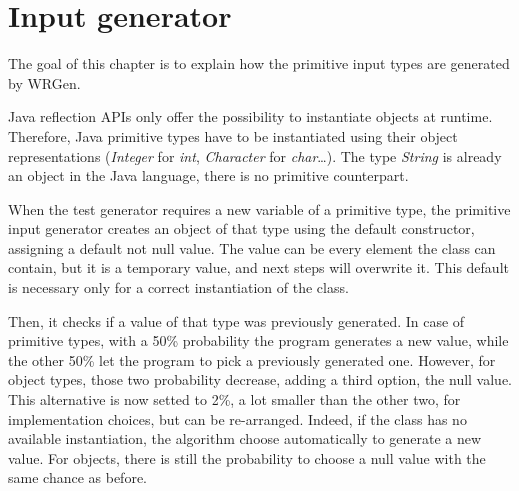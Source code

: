 \section{Input generator}\label{sec:pig}
The goal of this chapter is to explain how the primitive input types are generated by WRGen.

Java reflection APIs only offer the possibility to instantiate objects at runtime. Therefore, Java primitive types have to be instantiated using their object representations (\emph{Integer} for \emph{int}, \emph{Character} for \emph{char}\dots). The type \emph{String} is already an object in the Java language, there is no primitive counterpart.

When the test generator requires a new variable of a primitive type, the primitive input generator creates an object of that type using the default constructor, assigning a default not null value. The value can be every element the class can contain, but it is a temporary value, and next steps will overwrite it. 
This default is necessary only for a correct instantiation of the class.

Then, it checks if a value of that type was previously generated. In case of primitive types, with a 50\% probability the program generates a new value, while the other 50\% let the program to pick a previously generated one.
However, for object types, those two probability decrease, adding a third option, the null value. This alternative is now setted to 2\%, a lot smaller than the other two, for implementation choices, but can be re-arranged.
Indeed, if the class has no available instantiation, the algorithm choose automatically to generate a new value.
For objects, there is still the probability to choose a null value with the same chance as before.

